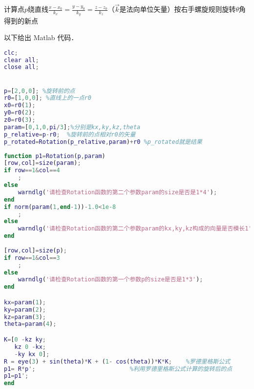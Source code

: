 
\begin{issues}
\issueDraft
\end{issues}



计算点$p$绕直线$\frac{x-x_0}{k_x}=\frac{y-y_0}{k_y}=\frac{z-z_0}{k_z}$（$\vec{k}$是法向单位矢量）按右手螺旋规则旋转$\theta$角得到的新点

以下给出 Matlab 代码．


\begin{lstlisting}[language=matlab]
%main.m
clc;
clear all;
close all;


p=[2,0,0]; %旋转前的点
r0=[1,0,0]; %直线上的一点r0
x0=r0(1);
y0=r0(2);
z0=r0(3);
param=[0,1,0,pi/3];%分别是kx,ky,kz,theta
p_relative=p-r0;  %旋转前的点相对r0的矢量
p_rotated=Rotation(p_relative,param)+r0 %p_rotated就是结果

\end{lstlisting}



\begin{lstlisting}[language=matlab]
% Rotaion.m
function p1=Rotation(p,param)
[row,col]=size(param);
if row==1&col==4 
    ;
else
    warndlg('请检查Rotation函数的第二个参数param的size是否是1*4');
end
if norm(param(1,end-1))-1.0<1e-8
    ;
else
    warndlg('请检查Rotation函数的第二个参数param的kx,ky,kz构成的向量是否模长1')
end   
    
[row,col]=size(p);
if row==1&col==3
    ;
else 
    warndlg('请检查Rotation函数的第一个参数p的size是否是1*3');
end

kx=param(1);
ky=param(2);
kz=param(3);
theta=param(4);

K=[0 -kz ky;
   kz 0 -kx;
   -ky kx 0];
R = eye(3) + sin(theta)*K + (1- cos(theta))*K*K;    %罗德里格斯公式
p1= R*p';                           %利用罗德里格斯公式计算的旋转后的点
p1=p1';
end
\end{lstlisting}

